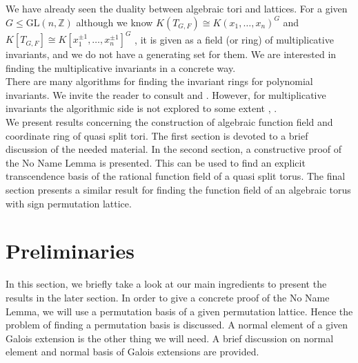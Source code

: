\documentclass[12pt]{article}
\theoremstyle{plain}
\newcommand{\Z}{\ensuremath{\mathbb{Z}}}
\begin{document}
We have already seen the duality between algebraic tori and lattices. For a given $G \leq \mathrm{GL}(n,\Z)$ although we know $K(T_{G,F}) \cong K(x_1, \ldots, x_n)^G$ and $K[T_{G,F}] \cong K[x^{\pm 1}_1, \ldots , x^{\pm 1}_n]^G$ , it is given as a field (or ring) of multiplicative invariants, and we do not have a generating set for them. We are interested in finding the multiplicative invariants in a concrete way.\\
There are many algorithms for finding the invariant rings for polynomial invariants. We invite the reader to consult \cite{Kemper2} and \cite{Sturmfels}. However, for multiplicative invariants the algorithmic side is not explored to some extent \cite{Kemper}, \cite{Renault}.\\

We present results concerning the construction of algebraic function field and coordinate ring of quasi split tori. The first section is devoted to a brief discussion of the needed material. In the second section, a constructive proof of the No Name Lemma is presented. This can be used to find an explicit transcendence basis of the rational function field of a quasi split torus. The final section presents a similar result for finding the function field of an algebraic torus with sign permutation lattice.

\section{Preliminaries}

In this section, we briefly take a look at our main ingredients to
present the results in the later section. In order to give a concrete
proof of the No Name Lemma, we will use a permutation basis of a given
permutation lattice. Hence the problem of finding a permutation basis
is discussed. A normal element of a given Galois extension is the
other thing we will need. A brief discussion on normal element and
normal basis of Galois extensions are provided.
\end{document}
